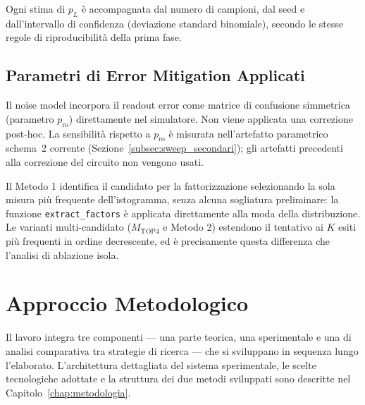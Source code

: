 \begin{onehalfspace}
Ogni stima di $p_L$ è accompagnata dal numero di campioni, dal seed e dall'intervallo di confidenza (deviazione standard binomiale), secondo le stesse regole di riproducibilità della prima fase.

\subsection{Parametri di Error Mitigation Applicati}

Il noise model incorpora il readout error come matrice di confusione simmetrica (parametro $p_{\text{ro}}$) direttamente nel simulatore. Non viene applicata una correzione post-hoc. La sensibilità rispetto a $p_{\text{ro}}$ è misurata nell'artefatto parametrico schema~2 corrente (Sezione~\ref{subsec:sweep_secondari}); gli artefatti precedenti alla correzione del circuito non vengono usati.

Il Metodo 1 identifica il candidato per la fattorizzazione selezionando la sola misura più frequente dell'istogramma, senza alcuna sogliatura preliminare: la funzione \texttt{extract\_factors} è applicata direttamente alla moda della distribuzione. Le varianti multi-candidato ($M_{\text{TOP4}}$ e Metodo 2) estendono il tentativo ai $K$ esiti più frequenti in ordine decrescente, ed è precisamente questa differenza che l'analisi di ablazione isola.

\section{Approccio Metodologico}

Il lavoro integra tre componenti --- una parte teorica, una sperimentale e una di analisi comparativa tra strategie di ricerca --- che si sviluppano in sequenza lungo l'elaborato. L'architettura dettagliata del sistema sperimentale, le scelte tecnologiche adottate e la struttura dei due metodi sviluppati sono descritte nel Capitolo~\ref{chap:metodologia}.

\end{onehalfspace}
